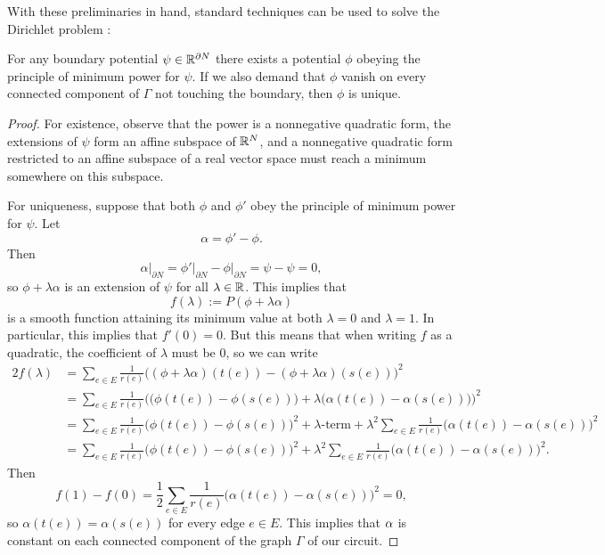 With these preliminaries in hand, standard techniques can be used to solve the
Dirichlet problem \cite{Fukushima}:
\begin{proposition} \label{dirichlet_problem}
For any boundary potential $\psi \in {\mathbb{R}}^{\partial N}$ there exists a potential $\phi$ obeying the principle of minimum power for $\psi$.  If we also demand that $\phi$ vanish on every connected component of $\Gamma$ not touching the boundary, then $\phi$ is unique. 
\end{proposition}
\begin{proof}
For existence, observe that the power is a nonnegative quadratic form, the extensions of $\psi$ form an affine subspace of ${\mathbb{R}}^N$, and a nonnegative quadratic form restricted to an affine subspace of a real vector space must reach a minimum somewhere on this subspace. 

For uniqueness, suppose that both $\phi$ and $\phi'$ obey the principle of minimum power for $\psi$. Let 
\[
\alpha = \phi'-\phi.
\]
Then 
\[
\alpha\big|_{\partial N} = \phi'\big|_{\partial N}-\phi\big|_{\partial N} = \psi-\psi =0,
\] 
so $\phi+\lambda\alpha$ is an extension of $\psi$ for all $\lambda \in {\mathbb{R}}$. This implies that
\[
f(\lambda) := P(\phi+\lambda\alpha)
\]
is a smooth function attaining its minimum value at both $\lambda=0$ and
$\lambda=1$. In particular, this implies that $f'(0)=0$. But this means that when writing $f$ as a quadratic, the coefficient of $\lambda$ must be $0$, so we can write
\begin{align*}
2f(\lambda) &= \sum_{e \in E} \frac1{r(e)}\big((\phi+\lambda\alpha)(t(e))-(\phi+\lambda\alpha)(s(e))\big)^2 \\
&= \sum_{e \in E} \frac1{r(e)}\Big(\big(\phi(t(e))-\phi(s(e))\big)+\lambda\big(\alpha(t(e))-\alpha(s(e))\big)\Big)^2 \\
&=  \sum_{e \in E} \frac1{r(e)}\big(\phi(t(e))-\phi(s(e))\big)^2 + \textrm{$\lambda$-term} +  \lambda^2 \sum_{e \in E} \frac1{r(e)}\big(\alpha(t(e))-\alpha(s(e))\big)^2 \\
&=  \sum_{e \in E} \frac1{r(e)}\big(\phi(t(e))-\phi(s(e))\big)^2 + \lambda^2 \sum_{e \in E} \frac1{r(e)}\big(\alpha(t(e))-\alpha(s(e))\big)^2.
\end{align*}
Then
\[
f(1) - f(0) 
= \frac{1}{2}\sum_{e \in E} \frac1{r(e)}\big(\alpha(t(e))-\alpha(s(e))\big)^2 =0,
\]
so $\alpha(t(e)) = \alpha(s(e))$ for every edge $e \in E$. This implies that $\alpha$ is constant on each connected component of the graph $\Gamma$ of our circuit. 


\end{proof}
